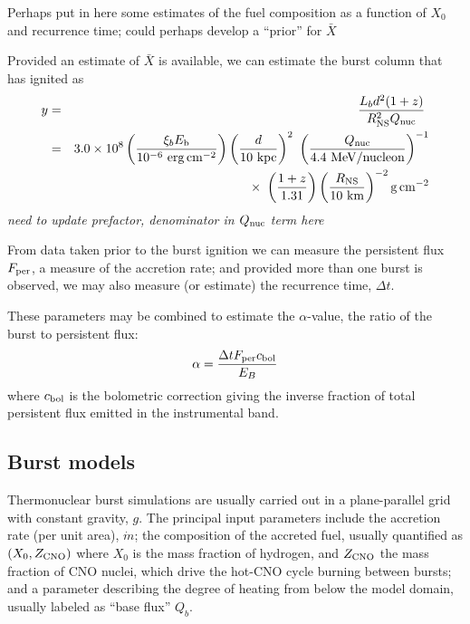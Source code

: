 \documentclass{aastex61}
\newcommand{\epc}{{\rm erg\,cm^{-2}}}
\begin{document}
Perhaps put in here some estimates of the fuel composition as a function of $X_0$ and recurrence time; could perhaps develop a ``prior'' for $\bar{X}$

Provided an estimate of $\bar{X}$ is available, we can estimate the burst column that has ignited as
\begin{eqnarray}
y & = & \frac{L_b d^2 (1+z)}{R_{\rm NS}^2 Q_{\rm nuc}}\ 
                                                            \nonumber \\
  & = & 3.0\times10^8 \left(\frac{\xi_b E_{\rm b}}{10^{-6}\ \epc}\right)
                      \left(\frac{d}{10\ {\rm kpc}}\right)^2\
             \left(\frac{Q_{\rm nuc}}{4.4\ {\rm MeV/nucleon}}\right)^{-1}
\nonumber \\ & & \times\  %
                      \left(\frac{1+z}{1.31}\right)
                      \left(\frac{R_{\rm NS}}{10\ {\rm km}}\right)^{-2}
                      {\rm g\,cm^{-2}}
\label{column}
\end{eqnarray}
{\it need to update prefactor, denominator in $Q_{\rm nuc}$ term here }

From data taken prior to the burst ignition we can measure the persistent flux $F_{\rm per}$, a measure of the accretion rate; and provided more than one burst is observed, we may also measure (or estimate) the recurrence time, $\Delta t$. 

These parameters may be combined to estimate the $\alpha$-value, the ratio of the burst to persistent flux: 
\begin{equation}
\alpha = \frac{\Delta t F_{\rm per} c_{\rm bol}}{E_B}
\end{equation}
where $c_{\rm bol}$ is the bolometric correction giving the inverse fraction of total persistent flux emitted in the instrumental band.

\subsection{Burst models}
\label{subsec:models}

Thermonuclear burst simulations \cite[e.g. with {\sc kepler};][]{woos04} are usually carried out in a plane-parallel grid with constant gravity, $g$. The principal input parameters include the accretion rate (per unit area), $\dot{m}$; the composition of the accreted fuel, usually quantified as $(X_0, Z_{\rm CNO})$ where $X_0$ is the mass fraction of hydrogen, and $Z_{\rm CNO}$ the mass fraction of CNO nuclei, which drive the hot-CNO cycle burning between bursts; and a parameter describing the degree of heating from below the model domain, usually labeled as ``base flux'' $Q_b$.
\end{document}
